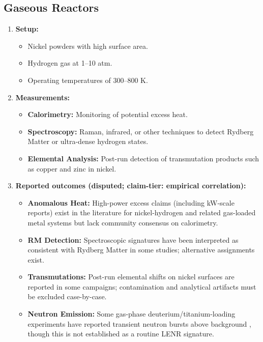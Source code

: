 \documentclass[11pt,a4paper]{article}
\begin{document}
\subsection{Gaseous Reactors}

\begin{enumerate}
\def\labelenumi{\arabic{enumi}.}
\item
  \textbf{Setup:}

  \begin{itemize}
    \item
    Nickel powders with high surface area.\\
  \item
    Hydrogen gas at 1--10 atm.\\
  \item
    Operating temperatures of 300--800 K.\\
  \end{itemize}
\item
  \textbf{Measurements:}

  \begin{itemize}
    \item
    \textbf{Calorimetry:} Monitoring of potential excess heat.\\
  \item
    \textbf{Spectroscopy:} Raman, infrared, or other techniques to detect Rydberg Matter or ultra-dense hydrogen states.\\
  \item
    \textbf{Elemental Analysis:} Post-run detection of transmutation products such as copper and zinc in nickel.\\
  \end{itemize}
\item
  \textbf{Reported outcomes (disputed; claim-tier: empirical correlation):}

  \begin{itemize}
    \item
    \textbf{Anomalous Heat:} High-power excess claims (including kW-scale reports) exist in the literature for nickel-hydrogen and related gas-loaded metal systems \citep{fralick2003,iwamura2024,celani2014,levi2013} but lack community consensus on calorimetry.\\
  \item
    \textbf{RM Detection:} Spectroscopic signatures have been interpreted as consistent with Rydberg Matter in some studies; alternative assignments exist.\\
  \item
    \textbf{Transmutations:} Post-run elemental shifts on nickel surfaces are reported in some campaigns; contamination and analytical artifacts must be excluded case-by-case.\\
  \item
    \textbf{Neutron Emission:} Some gas-phase deuterium/titanium-loading experiments have reported transient neutron bursts above background \citep{menlove1989}, though this is not established as a routine LENR signature.
  \end{itemize}
\end{enumerate}
\end{document}
